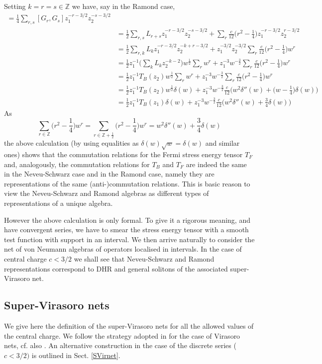 \documentclass[11pt]{article}
\def\de{\delta}
\begin{document}
Setting $k= r=s\in\mathbb Z$ we have, say in the Ramond case, 
\begin{align*}
[T_F&(z_1), T_F(z_2)]= \frac14\sum_{r,s}[G_r, G_s]z_1^{-r-3/2}z_2^{-s-3/2}\\ 
&= \frac12\sum_{r,s}L_{r+s}z_1^{-r-3/2}z_2^{-s-3/2} 
+  \sum_r \frac{c}{12}\big(r^2 - \frac14\big)z_1^{-r-3/2}z_2^{r-3/2}\\
&=\frac12\sum_{r,k}L_{k}z_1^{-r-3/2}z_2^{-k+r-3/2}
 + z_1^{-3/2}z_2^{-3/2}\sum_r\frac{c}{12}\big(r^2 - \frac14\big)w^r\\
&= \frac12 z_1^{-1}\Big(\sum_k L_{k}z_2^{-k-2}\Big) w^{\frac12}\sum_r w^{r} + z_1^{-3}w^{-\frac32}\sum_r\frac{c}{12}\big(r^2 - \frac14\big)w^r\\
&=\frac12 z_1^{-1}T_B(z_2) w^{\frac12}
\sum_r w^r + z_1^{-3} w^{-\frac32}\sum_r\frac{c}{12}\big(r^2 - \frac14\big)w^r\\
&= \frac12 z_1^{-1}T_B(z_2) w^{\frac12}\de(w)
+ z_1^{-3}w^{-\frac32}\frac{c}{12}
\Big(w^2\de''(w)  + \big(w-\frac14\big)\de(w)\Big)\\
&= \frac12 z_1^{-1}T_B(z_1) \de(w)
+ z_1^{-3}w^{-\frac32}\frac{c}{12}
\Big(w^2\de''(w)  + \frac34\de(w)\Big)
\end{align*}
As
\[
\sum_{r\in\mathbb Z} \big(r^2 - \frac14\big)w^r 
=\sum_{r\in\mathbb Z +\frac12} \big(r^2 - \frac14\big)w^r
= w^2\de''(w)  + \frac34\de(w)
\]
the above calculation (by using equalities as $\de(w)\sqrt{w}=\de(w)$ and similar ones) shows that the commutation relations for the Fermi stress energy tensor $T_F$ and, analogously, the commutation relations for $T_B$ and $T_F$ are indeed the same in the Neveu-Schwarz case and in the Ramond case, namely they are representations of the same (anti-)commutation relations. This is basic reason to view the Neveu-Schwarz and Ramond algebras as different types of representations of a unique algebra. 

However the above calculation is only formal. To give it a rigorous meaning, 
and have convergent series, we have to smear the stress energy tensor with a 
smooth test function with support in an interval. We then arrive naturally to 
consider the net of von Neumann algebras of operators localised in intervals. 
In the case of central charge $c<3/2$ we shall see that Neveu-Schwarz and 
Ramond representations correspond to DHR and general 
solitons of the associated super-Virasoro net.

\subsection{Super-Virasoro nets}
We give here the definition of the super-Virasoro nets for all the 
allowed values of the central charge. 
We follow the strategy adopted in \cite{BS-M} for the case of Virasoro nets, 
cf. also \cite{Car04,loke}. An alternative construction in the case of the 
discrete series ($c<3/2)$ is outlined in Sect. \ref{SVirnet}. 
\end{document}
